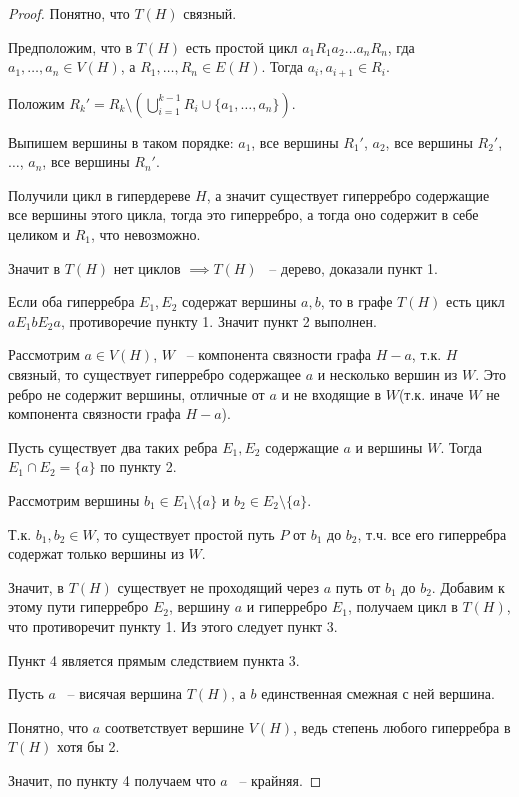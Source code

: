 \begin{proof}
	Понятно, что $T(H)$ связный.

	Предположим, что в $T(H)$ есть простой цикл $a_1 R_1 a_2 \ldots a_n R_n$, гда $a_1, \ldots, a_n \in V(H)$, а $R_1, \ldots, R_n \in E(H)$.
	Тогда $a_i, a_{i + 1} \in R_i$.

	Положим  $R_k' = R_k \setminus\left(\bigcup_{i = 1}^{k - 1} R_i \cup \{a_1, \ldots, a_n\}\right)$.

	Выпишем вершины в таком порядке: $a_1$, все вершины $R_1'$,  $a_2$, все вершины $R_2'$,  $\dots$,  $a_n$, все вершины  $R_n'$.

	Получили цикл в гипердереве  $H$, а значит существует гиперребро содержащие все вершины этого цикла, тогда это гиперребро, а тогда оно содержит в себе целиком и $R_1$, что невозможно.

	Значит в  $T(H)$ нет циклов  $\implies T(H)$ ~-- дерево, доказали пункт 1.

	Если оба гиперребра  $E_1, E_2$ содержат вершины $a, b$, то в графе  $T(H)$ есть цикл  $a E_1 b E_2 a$, противоречие пункту 1. Значит пункт 2 выполнен.

	Рассмотрим $a \in V(H)$, $W$ ~-- компонента связности графа $H - a$, т.к. $H$ связный, то существует гиперребро содержащее $a$ и несколько вершин из $W$.
	Это ребро не содержит вершины, отличные от $a$ и не входящие в $W$(т.к. иначе $W$ не компонента связности графа $H - a$).

	Пусть существует два таких ребра $E_1, E_2$ содержащие $a$ и вершины $W$.
	Тогда  $E_1 \cap E_2 = \{a\}$ по пункту 2.

	Рассмотрим вершины $b_1 \in E_1 \setminus \{a\}$ и $b_2 \in E_2 \setminus \{a\}$.

	Т.к. $b_1, b_2 \in W$, то существует простой путь $P$ от $b_1$ до $b_2$, т.ч. все его гиперребра содержат только вершины из $W$.

	Значит, в $T(H)$ существует не проходящий через  $a$ путь от $b_1$ до $b_2$.
	Добавим к этому пути гиперребро $E_2$, вершину $a$ и гиперребро  $E_1$, получаем цикл в  $T(H)$, что противоречит пункту 1.
	Из этого следует пункт 3.

	Пункт 4 является прямым следствием пункта 3.

	Пусть  $a$ ~-- висячая вершина  $T(H)$, а $b$ единственная смежная с ней вершина.

	Понятно, что $a$ соответствует вершине $V(H)$, ведь степень любого гиперребра в $T(H)$ хотя бы 2.

	Значит, по пункту 4 получаем что  $a$ ~-- крайняя.


\end{proof}
